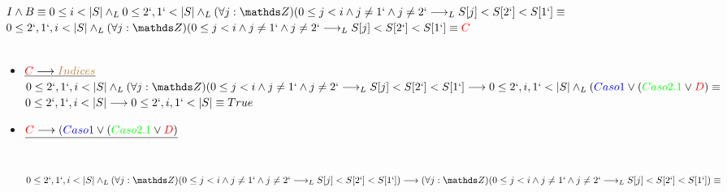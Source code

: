 \documentclass[10pt,a4paper]{article}
\begin{document}
\begin{enumerate}
        \\

        $I\land B \equiv 0\leq i < |S| \land_L 0\leq 2` , 1` < |S| \land_L (\forall j : \ent)(0\leq j < i \land j\neq 1` \land j \neq 2`\longrightarrow_L S[j]<S[2`]<S[1`] \equiv $ \\
        
        $ 0\leq 2` , 1`,i < |S| \land_L (\forall j : \ent)(0\leq j < i \land j\neq 1` \land j \neq 2`\longrightarrow_L S[j]<S[2`]<S[1`] \equiv \textcolor{red}{C} $\\

        
        \\

        \begin{itemize}
            \item  $\underline{\textcolor{red}{C} \longrightarrow \textcolor{brown}{Indices}}$ \\
                $0\leq 2` , 1`,i < |S| \land_L (\forall j : \ent)(0\leq j < i \land j\neq 1` \land j \neq 2`\longrightarrow_L S[j]<S[2`]<S[1`] \longrightarrow 0\leq 2`,i,1`<|S| \land_L (\textcolor{blue}{Caso1} \lor (\textcolor{green}{Caso2.1} \lor \textcolor{red}{D}) \equiv$\\

                $0\leq 2` , 1`,i < |S| \longrightarrow  0\leq 2`,i,1`<|S| \equiv True $
            \item  $\underline{\textcolor{red}{C} \longrightarrow (\textcolor{blue}{Caso1} \lor (\textcolor{green}{Caso2.1} \lor \textcolor{red}{D}) }  $\\
            \\

            \\

            $0\leq 2` , 1`,i < |S| \land_L (\forall j : \ent)(0\leq j < i \land j\neq 1` \land j \neq 2`\longrightarrow_L S[j]<S[2`]<S[1`]) \longrightarrow (\forall j : \ent)(0\leq j < i \land j\neq 1` \land j \neq 2`\longrightarrow_L S[j]<S[2`]<S[1`]) \equiv$\\


\end{itemize}
\end{enumerate}
\end{document}
